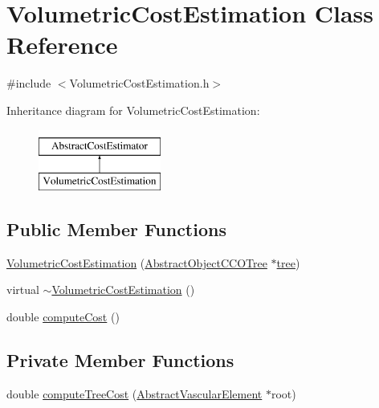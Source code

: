 \hypertarget{class_volumetric_cost_estimation}{}\section{Volumetric\+Cost\+Estimation Class Reference}
\label{class_volumetric_cost_estimation}


{\ttfamily \#include $<$Volumetric\+Cost\+Estimation.\+h$>$}

Inheritance diagram for Volumetric\+Cost\+Estimation\+:\begin{figure}[H]
\begin{center}
\leavevmode
\includegraphics[height=2.000000cm]{d7/d4e/class_volumetric_cost_estimation}
\end{center}
\end{figure}
\subsection*{Public Member Functions}
\begin{DoxyCompactItemize}
\item 
\mbox{\hyperlink{class_volumetric_cost_estimation_a51639a770cca0faa91394c672f84cd5d}{Volumetric\+Cost\+Estimation}} (\mbox{\hyperlink{class_abstract_object_c_c_o_tree}{Abstract\+Object\+C\+C\+O\+Tree}} $\ast$\mbox{\hyperlink{class_abstract_cost_estimator_a0ec4eb1fa41bdfb25ad2099dc9fc16c4}{tree}})
\item 
virtual \mbox{\hyperlink{class_volumetric_cost_estimation_a6469f825673166358c7a3b78b57fb8dc}{$\sim$\+Volumetric\+Cost\+Estimation}} ()
\item 
double \mbox{\hyperlink{class_volumetric_cost_estimation_ae6aa420485924904c08759ef32810c04}{compute\+Cost}} ()
\end{DoxyCompactItemize}
\subsection*{Private Member Functions}
\begin{DoxyCompactItemize}
\item 
double \mbox{\hyperlink{class_volumetric_cost_estimation_a5082e98b1aad95975a56c828c1fdbf43}{compute\+Tree\+Cost}} (\mbox{\hyperlink{class_abstract_vascular_element}{Abstract\+Vascular\+Element}} $\ast$root)
\end{DoxyCompactItemize}

